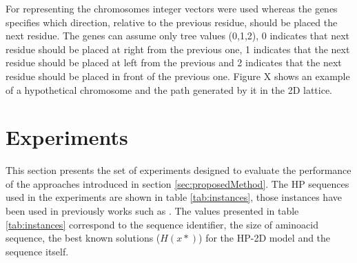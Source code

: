 For representing the chromosomes integer vectors were used whereas the genes specifies which direction, relative to the previous residue, should be placed the next residue. The genes can assume only tree values (0,1,2), 0 indicates that next residue should be placed at right from the previous one, 1 indicates that the next residue should be placed at left from the previous and 2 indicates that the next residue should be placed in front of the previous one. Figure X shows an example of a hypothetical chromosome and the path generated by it in the 2D lattice.
 



\section{Experiments}

This section presents the set of experiments designed to evaluate the performance of the approaches introduced in section \ref{sec:proposedMethod}. The HP sequences used in the experiments are shown in table \ref{tab:instances}, those instances have been used in previously works such as \cite{bastolla1997testing,shmygelska2002ant,unger1993genetic,cotta2003protein, santana2004protein,shmygelska2003improved,lesh2003complete}. The values presented in table \ref{tab:instances} correspond to the sequence identifier, the size of aminoacid sequence, the best known solutions ($H(x*)$) for the HP-2D model and the sequence itself. 

